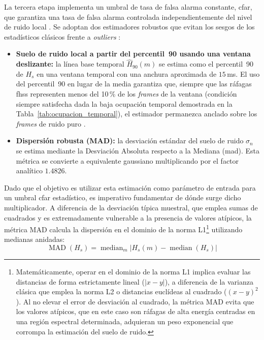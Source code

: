 La tercera etapa implementa un umbral de tasa de falsa alarma constante, \gls{cfar}, que garantiza una tasa de falsa alarma controlada independientemente del nivel de ruido local \cite{zhang_entropy-based_1989}. Se adoptan dos estimadores robustos que evitan los sesgos de los estadísticos clásicos frente a \textit{outliers} \cite{hampel_robust_1986}:

\begin{itemize}\itemsep 0em
    \item \textbf{Suelo de ruido local a partir del percentil~90 usando una ventana deslizante:} la línea base temporal $\widehat{H}_{90}(m)$ se estima como el percentil~90 de $H_s$ en una ventana temporal con una anchura aproximada de $15$\,ms. El uso del percentil~90 en lugar de la media garantiza que, siempre que las ráfagas \gls{fhss} representen menos del 10\,\% de los \textit{frames} de la ventana (condición siempre satisfecha dada la baja ocupación temporal demostrada en la Tabla~\ref{tab:ocupacion_temporal}), el estimador permanezca anclado sobre los \textit{frames} de ruido puro \cite{vasant_ahirrao_rf-based_2024}.

     \item \textbf{Dispersión robusta (MAD):} la desviación estándar del suelo de ruido $\sigma_n$ se estima mediante la Desviación Absoluta respecto a la Mediana (\gls{mad}). Esta métrica se convierte a equivalente gaussiano multiplicando por el factor analítico $1.4826$.
\end{itemize}

Dado que el objetivo es utilizar esta estimación como parámetro de entrada para un umbral \gls{cfar} estadístico, es imperativo fundamentar de dónde surge dicho multiplicador. A diferencia de la desviación típica muestral, que emplea sumas de cuadrados y es extremadamente vulnerable a la presencia de valores atípicos, la métrica MAD calcula la dispersión en el dominio de la norma L1\footnote{Matemáticamente, operar en el dominio de la norma L1 implica evaluar las distancias de forma estrictamente lineal ($|x - y|$), a diferencia de la varianza clásica que emplea la norma L2 o distancias euclídeas al cuadrado ($(x - y)^2$). Al no elevar el error de desviación al cuadrado, la métrica MAD evita que los valores atípicos, que en este caso son ráfagas de alta energía centradas en una región espectral determinada, adquieran un peso exponencial que corrompa la estimación del suelo de ruido.} utilizando medianas anidadas:
\begin{equation}
    \operatorname{MAD}(H_s) = \operatorname{median}_m\!\left|H_s(m) - \operatorname{median}(H_s)\right|
    \label{eq:mad_def}
\end{equation}

